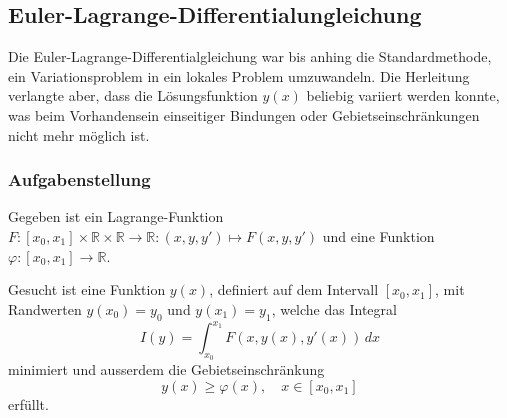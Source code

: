 %
%
\subsection{Euler-Lagrange-Differentialungleichung
\label{buch:nebenbedingungen:einseitig:subsection:eldgl}}
Die Euler-Lagrange-Differentialgleichung war bis anhing die Standardmethode,
ein Variationsproblem in ein lokales Problem umzuwandeln.
Die Herleitung verlangte aber, dass die Lösungsfunktion $y(x)$ beliebig
variiert werden konnte, was beim Vorhandensein einseitiger Bindungen
oder Gebietseinschränkungen nicht mehr möglich ist.

%
%
\subsubsection{Aufgabenstellung}
Gegeben ist ein Lagrange-Funktion
$F\colon [x_0,x_1]\times\mathbb{R}\times\mathbb{R}\to\mathbb{R}:(x,y,y')\mapsto F(x,y,y')$ 
und eine Funktion $\varphi\colon[x_0,x_1]\to\mathbb{R}$.

\begin{aufgabe}
\label{buch:nebenbedingungen:einseitig:aufgabe}
Gesucht ist eine Funktion $y(x)$, definiert auf dem Intervall $[x_0,x_1]$,
mit Randwerten $y(x_0) = y_0$ und $y(x_1)=y_1$, welche das Integral
\[
I(y)
=
\int_{x_0}^{x_1} F(x,y(x),y'(x))\,dx
\]
minimiert und ausserdem die Gebietseinschränkung
\[
y(x) \ge \varphi(x), \quad x\in[x_0,x_1]
\]
erfüllt.
\end{aufgabe}

%
%
